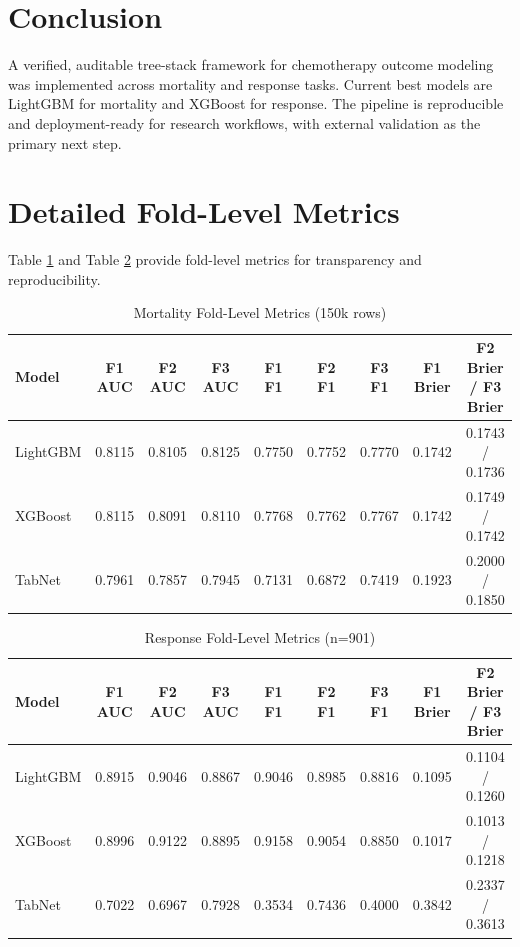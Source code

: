 \documentclass[conference]{IEEEtran}
\begin{document}
\section{Conclusion}
A verified, auditable tree-stack framework for chemotherapy outcome modeling was implemented across mortality and response tasks. Current best models are LightGBM for mortality and XGBoost for response. The pipeline is reproducible and deployment-ready for research workflows, with external validation as the primary next step.

\appendices
\section{Detailed Fold-Level Metrics}
Table \ref{tab:conf_mortality_folds} and Table \ref{tab:conf_response_folds} provide fold-level metrics for transparency and reproducibility.

\begin{table}[htbp]
\caption{Mortality Fold-Level Metrics (150k rows)}
\label{tab:conf_mortality_folds}
\centering
\small
\begin{tabular}{lcccccccc}
\toprule
Model & F1 AUC & F2 AUC & F3 AUC & F1 F1 & F2 F1 & F3 F1 & F1 Brier & F2 Brier / F3 Brier \\
\midrule
LightGBM & 0.8115 & 0.8105 & 0.8125 & 0.7750 & 0.7752 & 0.7770 & 0.1742 & 0.1743 / 0.1736 \\
XGBoost & 0.8115 & 0.8091 & 0.8110 & 0.7768 & 0.7762 & 0.7767 & 0.1742 & 0.1749 / 0.1742 \\
TabNet & 0.7961 & 0.7857 & 0.7945 & 0.7131 & 0.6872 & 0.7419 & 0.1923 & 0.2000 / 0.1850 \\
\bottomrule
\end{tabular}
\end{table}

\begin{table}[htbp]
\caption{Response Fold-Level Metrics (n=901)}
\label{tab:conf_response_folds}
\centering
\small
\begin{tabular}{lcccccccc}
\toprule
Model & F1 AUC & F2 AUC & F3 AUC & F1 F1 & F2 F1 & F3 F1 & F1 Brier & F2 Brier / F3 Brier \\
\midrule
LightGBM & 0.8915 & 0.9046 & 0.8867 & 0.9046 & 0.8985 & 0.8816 & 0.1095 & 0.1104 / 0.1260 \\
XGBoost & 0.8996 & 0.9122 & 0.8895 & 0.9158 & 0.9054 & 0.8850 & 0.1017 & 0.1013 / 0.1218 \\
TabNet & 0.7022 & 0.6967 & 0.7928 & 0.3534 & 0.7436 & 0.4000 & 0.3842 & 0.2337 / 0.3613 \\
\bottomrule
\end{tabular}
\end{table}
\end{document}
